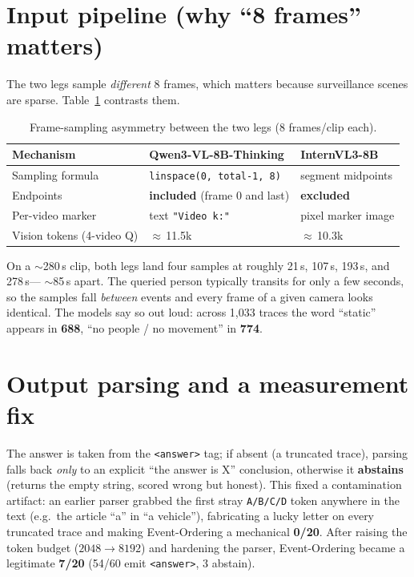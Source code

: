 \documentclass[11pt]{article}
\begin{document}
\section{Input pipeline (why ``8 frames'' matters)}
The two legs sample \emph{different} 8 frames, which matters because surveillance scenes are sparse.
Table~\ref{tab:sampling} contrasts them.

\begin{table}[h]
\centering
\caption{Frame-sampling asymmetry between the two legs (8 frames/clip each).}
\label{tab:sampling}
\begin{tabular}{lll}
\toprule
Mechanism & Qwen3-VL-8B-Thinking & InternVL3-8B \\
\midrule
Sampling formula & \texttt{linspace(0,\,total-1,\,8)} & segment midpoints \\
Endpoints        & \textbf{included} (frame 0 and last) & \textbf{excluded} \\
Per-video marker & text \texttt{"Video k:"} & pixel marker image \\
Vision tokens (4-video Q) & $\approx$\,11.5k & $\approx$\,10.3k \\
\bottomrule
\end{tabular}
\end{table}

On a $\sim$280\,s clip, both legs land four samples at roughly 21\,s, 107\,s, 193\,s, and 278\,s---
$\sim$85\,s apart. The queried person typically transits for only a few seconds, so the samples fall
\emph{between} events and every frame of a given camera looks identical. The models say so out loud:
across 1,033 traces the word ``static'' appears in \textbf{688}, ``no people / no movement'' in
\textbf{774}.

\section{Output parsing and a measurement fix}
The answer is taken from the \texttt{<answer>} tag; if absent (a truncated trace), parsing falls back
\emph{only} to an explicit ``the answer is X'' conclusion, otherwise it \textbf{abstains}
(returns the empty string, scored wrong but honest). This fixed a contamination artifact: an earlier
parser grabbed the first stray \texttt{A/B/C/D} token anywhere in the text (e.g.\ the article ``a''
in ``a vehicle''), fabricating a lucky letter on every truncated trace and making Event-Ordering a
mechanical \textbf{0/20}. After raising the token budget ($2048\!\rightarrow\!8192$) and hardening
the parser, Event-Ordering became a legitimate \textbf{7/20} (54/60 emit \texttt{<answer>},
3 abstain).
\end{document}
